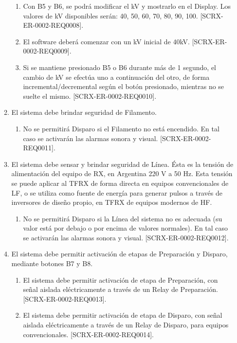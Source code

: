 \documentclass[
11pt, %
]{charter}
\begin{document}
\begin{enumerate}
\begin{enumerate}
				\begin{enumerate}
					\item Con B5 y B6, se podrá modificar el kV y mostrarlo en el Display. Los valores de kV disponibles serán: 40, 50, 60, 70, 80, 90, 100. [SCRX-ER-0002-REQ0008].
					\item El software deberá comenzar con un kV inicial de 40kV. [SCRX-ER-0002-REQ0009].
					\item Si se mantiene presionado B5 o B6 durante más de 1 segundo, el cambio de kV se efectúa uno a continuación del otro, de forma incremental/decremental según el botón presionado, mientras no se suelte el mismo. [SCRX-ER-0002-REQ0010].
				\end{enumerate}
		 
			\item El sistema debe brindar seguridad de Filamento. 
				\begin{enumerate}
				 \item No se permitirá Disparo si el Filamento no está encendido. En tal caso se activarán las alarmas sonora y visual. [SCRX-ER-0002-REQ0011].
				\end{enumerate}
			\item El sistema debe sensar y brindar seguridad de Línea. Ésta es la tensión de alimentación del equipo de RX, en Argentina 220 V a 50 Hz. Esta tensión se puede aplicar al TFRX de forma directa en equipos convencionales de LF, o se utiliza como fuente de energía para generar pulsos a través de inversores de diseño propio, en TFRX de equipos modernos de HF.
				\begin{enumerate}
					\item No se permitirá Disparo si la Línea del sistema no es adecuada (su valor está por debajo o por encima de valores normales). En tal caso se activarán las alarmas sonora y visual. [SCRX-ER-0002-REQ0012].
				\end{enumerate}
			\item El sistema debe permitir activación de etapas de Preparación y Disparo, mediante botones B7 y B8.
				\begin{enumerate}
					\item El sistema debe permitir activación de etapa de Preparación, con señal aislada eléctricamente a través de un Relay de Preparación. [SCRX-ER-0002-REQ0013].
					\item El sistema debe permitir activación de etapa de Disparo, con señal aislada eléctricamente a través de un Relay de Disparo, para equipos convencionales. [SCRX-ER-0002-REQ0014].

\end{enumerate}
\end{enumerate}
\end{enumerate}
\end{document}
